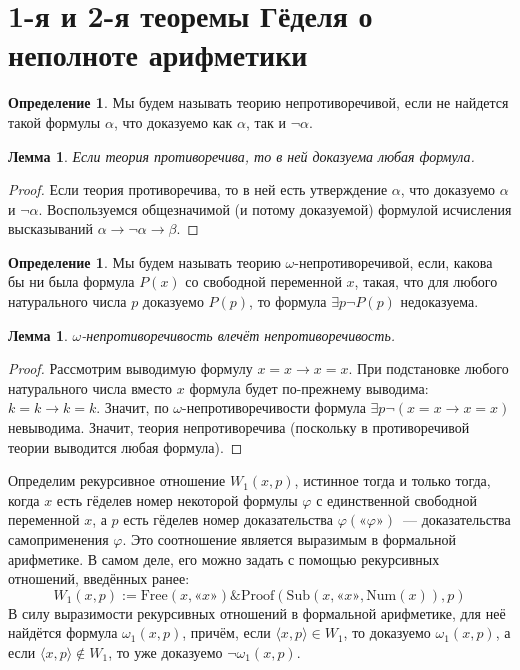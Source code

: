 \documentclass[a4paper,11pt]{article}
\newtheorem{lmm}[thm]{Лемма}
\theoremstyle{definition}
\newtheorem{dfn}[thm]{Определение}
\newcommand{\amp}{\mathbin{\&}}
\newcommand{\gn}[1]{\text{«}#1\text{»}}
\begin{document}
\section{1-я и 2-я теоремы Гёделя о неполноте арифметики}
\begin{dfn}
Мы будем называть теорию непротиворечивой, если не найдется такой формулы
$\alpha$, что доказуемо как $\alpha$, так и $\neg\alpha$.
\end{dfn}

\begin{lmm}
Если теория противоречива, то в ней доказуема любая формула.
\end{lmm}
\begin{proof}
Если теория противоречива, то в ней есть утверждение $\alpha$, что доказуемо
$\alpha$ и $\neg\alpha$. Воспользуемся общезначимой (и потому доказуемой)
формулой исчисления высказываний $\alpha \to \neg\alpha \to \beta$.
\end{proof}

\begin{dfn}
Мы будем называть теорию $\omega$-непротиворечивой, если, какова бы ни была
формула $P(x)$ со свободной переменной $x$, такая, что для любого натурального
числа $p$ доказуемо $P(p)$, то формула $\exists p\neg P(p)$ недоказуема.
\end{dfn}

\begin{lmm}
$\omega$-непротиворечивость влечёт непротиворечивость.
\end{lmm}
\begin{proof}
Рассмотрим выводимую формулу $x = x \to x = x$. При подстановке любого
натурального числа вместо $x$ формула будет по-прежнему выводима: $k = k \to
k = k$. Значит, по $\omega$-непротиворечивости формула $\exists p\neg(x = x \to
x = x)$ невыводима. Значит, теория непротиворечива (поскольку в противоречивой
теории выводится любая формула).
\end{proof}

Определим рекурсивное отношение $W_1(x, p)$, истинное тогда и только тогда,
когда $x$ есть гёделев номер некоторой формулы $\varphi$ с единственной
свободной переменной $x$, а $p$ есть гёделев номер доказательства
$\varphi(\gn{\varphi})$~--- доказательства самоприменения $\varphi$. Это
соотношение является выразимым в формальной арифметике. В самом деле, его можно
задать с помощью рекурсивных отношений, введённых ранее:
\[ W_1(x, p) := \mathrm{Free}(x, \gn{x}) \amp \mathrm{Proof}(\mathrm{Sub}(x, \gn{x}, \mathrm{Num}(x)), p) \]
В силу выразимости рекурсивных отношений в формальной арифметике, для неё
найдётся формула $\omega_1(x, p)$, причём, если $\langle x, p\rangle \in W_1$, то
доказуемо $\omega_1(x, p)$, а если $\langle x, p\rangle \notin W_1$, то уже
доказуемо $\neg\omega_1(x, p)$.
\end{document}
